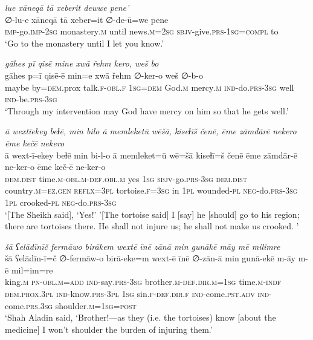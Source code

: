 \ea \label{DG.45}
\textit{lue xāneqā tā xeberit dewwe pene’} \\ 
\gll ∅-lu-e xāneqā tā xeber=it ∅-de-ū=we pene \\ 
 \textsc{imp-}go.\textsc{imp-}\textsc{2sg} monastery\textsc{.m} until news\textsc{.m}\textsc{=\textsc{2sg}} \textsc{sbjv-}give\textsc{.prs}\textsc{-1sg}\textsc{=\textsc{compl}} to \\ 
\glt `Go to the monastery until I let you know.'
\z 
 
\ea \label{DG.59}
\textit{gāhes pī qisē mine xwā řehm kero, weš bo} \\ 
\gll gāhes p=ī qisē-ē min=e xwā řehm ∅-ker-o weš ∅-b-o \\ 
 maybe by\textsc{=dem}.prox talk\textsc{\textsc{.f}}\textsc{-obl}\textsc{\textsc{.f}} \textsc{1sg}\textsc{=dem} God\textsc{.m} mercy\textsc{.m} \textsc{ind-}do\textsc{.prs}\textsc{-3sg} well \textsc{ind-}be\textsc{.prs}\textsc{-3sg} \\ 
\glt `Through my intervention may God have mercy on him so that he gets well.'
\z 
 
\ea \label{DG.64}
\textit{ā wextīekey beɫē, min bilo ā memleketū wēšā, kiseɫīš čenē, ēme zāmdārē nekero ēme kečē nekero} \\ 
\gll ā wext-ī-ekey beɫē min bi-l-o ā memleket=ū wē=šā kiseɫī=š čenē ēme zāmdār-ē ne-ker-o ēme keč-ē ne-ker-o \\ 
 \textsc{dem.dist} time\textsc{.m}\textsc{-obl}\textsc{.m}\textsc{-def}\textsc{.obl}\textsc{.m} yes \textsc{1sg} \textsc{sbjv-}go\textsc{.prs}\textsc{-3sg} \textsc{dem.dist} country\textsc{.m}\textsc{=ez}\textsc{.gen} \textsc{reflx}\textsc{=3pl} tortoise\textsc{\textsc{.f}}\textsc{=3sg} in \textsc{1pl} wounded\textsc{\textsc{-pl}} \textsc{neg-}do\textsc{.prs}\textsc{-3sg} \textsc{1pl} crooked\textsc{\textsc{-pl}} \textsc{neg-}do\textsc{.prs}\textsc{-3sg} \\ 
\glt `[The Sheikh said], ‘Yes!' '[The tortoise said] I [say] he [should] go to his region; there are tortoises there. He shall not injure us; he shall not make us crooked. '
\z 
 
\ea \label{DG.67}
\textit{šā ʕelādīnīč fermāwo birākem wextē īnē zānā min gunākē māy mē milimre} \\ 
\gll šā ʕelādīn-ī=č ∅-fermāw-o birā-eke=m wext-ē īnē ∅-zān-ā min gunā-ekē m-āy m-ē mil=im=re \\ 
 king\textsc{.m} \textsc{pn}\textsc{-obl}\textsc{.m}\textsc{=add} \textsc{ind-}say\textsc{.prs}\textsc{-3sg} brother\textsc{.m}\textsc{-def}\textsc{.dir}\textsc{.m}\textsc{=1sg} time\textsc{.m}\textsc{-indf} \textsc{dem.prox}\textsc{.3pl} \textsc{ind-}know\textsc{.prs}\textsc{-3pl} \textsc{1sg} sin\textsc{\textsc{.f}}\textsc{-def}\textsc{.dir}\textsc{\textsc{.f}} \textsc{ind-}come\textsc{.pst}\textsc{.adv} \textsc{ind-}come\textsc{.prs}\textsc{.3sg} shoulder\textsc{.m}\textsc{=1sg}\textsc{=\textsc{post}} \\ 
\glt `Shah Aladin said, ‘Brother!—as they (i.e. the tortoises) know [about the medicine] I won’t shoulder the burden of injuring them.'
\z 
 

